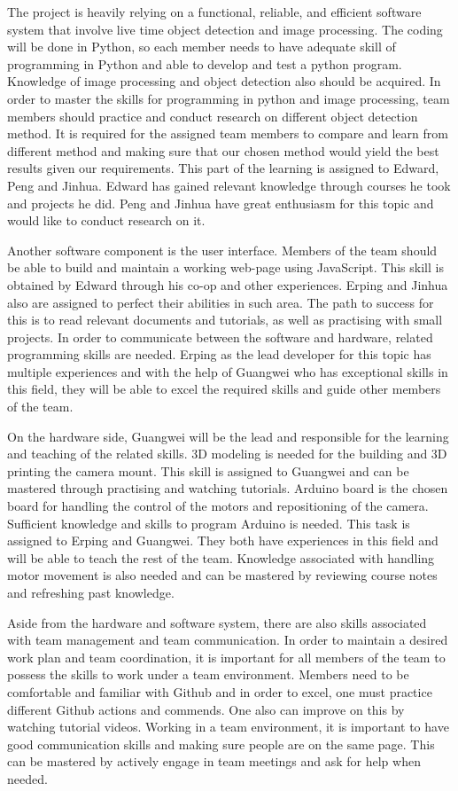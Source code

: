 \documentclass[12pt]{article}
\begin{document}
The project is heavily relying on a functional, reliable, and efficient software system that involve live time object detection and image processing. The coding will be done in Python, so each member needs to have adequate skill of programming in Python and able to develop and test a python program. Knowledge of image processing and object detection also should be acquired.  In order to master the skills for programming in python and image processing, team members should practice and conduct research on different object detection method. It is required for the assigned team members to compare and learn from different method and making sure that our chosen method would yield the best results given our requirements. This part of the learning is assigned to Edward, Peng and Jinhua. Edward has gained relevant knowledge through courses he took and projects he did. Peng and Jinhua have great enthusiasm for this topic and would like to conduct research on it. 

Another software component is the user interface. Members of the team should be able to build and maintain a working web-page using JavaScript. This skill is obtained by Edward through his co-op and other experiences. Erping and Jinhua also are assigned to perfect their abilities in such area. The path to success for this is to read relevant documents and tutorials, as well as practising with small projects.
In order to communicate between the software and hardware, related programming skills are needed. Erping as the lead developer for this topic has multiple experiences and with the help of Guangwei who has exceptional skills in this field, they will be able to excel the required skills and guide other members of the team.  

On the hardware side, Guangwei will be the lead and responsible for the learning and teaching of the related skills. 3D modeling is needed for the building and 3D printing the camera mount. This skill is assigned to Guangwei and can be mastered through practising and watching tutorials. Arduino board is the chosen board for handling the control of the motors and repositioning of the camera. Sufficient knowledge and skills to program Arduino is needed. This task is assigned to Erping and Guangwei. They both have experiences in this field and will be able to teach the rest of the team. Knowledge associated with handling motor movement is also needed and can be mastered by reviewing course notes and refreshing past knowledge. 

Aside from the hardware and software system, there are also skills associated with team management and team communication. In order to maintain a desired work plan and team coordination, it is important for all members of the team to possess the skills to work under a team environment. Members need to be comfortable and familiar with Github and in order to excel, one must practice different Github actions and commends. One also can improve on this by watching tutorial videos. Working in a team environment, it is important to have good communication skills and making sure people are on the same page. This can be mastered by actively engage in team meetings and ask for help when needed.  
\end{document}
